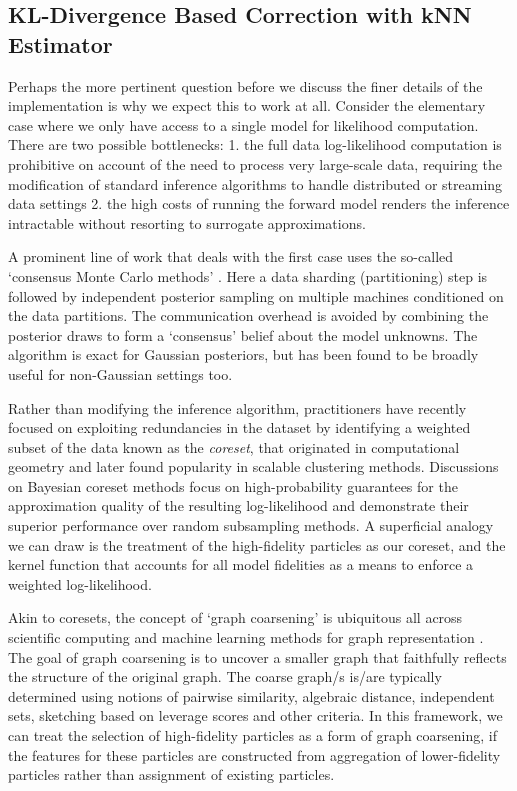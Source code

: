 \documentclass[12pt]{article}
\renewcommand{\[}{\left[}
\renewcommand{\]}{\right]}
\renewcommand{\(}{\left(}
\renewcommand{\)}{\right)}
\begin{document}
\subsection{KL-Divergence Based Correction with kNN Estimator}





Perhaps the more pertinent question before we discuss the finer details of the implementation is why we expect this to work at all. Consider the elementary case where we only have access to a single model for likelihood computation. 
There are two possible bottlenecks: 1. the full data log-likelihood computation is prohibitive on account of the need to process very large-scale data, requiring the modification of standard inference algorithms to handle distributed or streaming data settings 2. the high costs of running the forward model renders the inference intractable without resorting to surrogate approximations. 

A prominent line of work that deals with the first case uses the so-called `consensus Monte Carlo methods' \citep{rabinovich_variational_2015,scott_bayes_2016}. Here a data sharding (partitioning) step is followed by independent posterior sampling on multiple machines conditioned on the data partitions. 
The communication overhead is avoided by combining the posterior draws to form a `consensus' belief about the model unknowns.
The algorithm is exact for Gaussian posteriors, but has been found to be broadly useful for non-Gaussian settings too.

Rather than modifying the inference algorithm, practitioners have recently focused on exploiting redundancies in the dataset by identifying a weighted subset of the data known as the \emph{coreset}, that originated in computational geometry \citep{agarwal_geometric_2007} and later found popularity in scalable clustering methods.
Discussions on Bayesian coreset methods \citep{huggins_coresets_2016,campbell_automated_2019} focus on high-probability guarantees for the approximation quality of the resulting log-likelihood and demonstrate their superior performance over random subsampling methods. A superficial analogy we can draw is the treatment of the high-fidelity particles as our coreset, and the kernel function that accounts for all model fidelities as a means to enforce a weighted log-likelihood.

Akin to coresets, the concept of `graph coarsening' is ubiquitous all across scientific computing and machine learning methods for graph representation \citep{chen_graph_2022}. The goal of graph coarsening is to uncover a smaller graph that faithfully reflects the structure of the original graph. The coarse graph/s is/are typically determined using notions of pairwise similarity, algebraic distance, independent sets, sketching based on leverage scores and other criteria. 
In this framework, we can treat the selection of high-fidelity particles as a form of graph coarsening, if the features for these particles are constructed from aggregation of lower-fidelity particles rather than assignment of existing particles.
\end{document}
